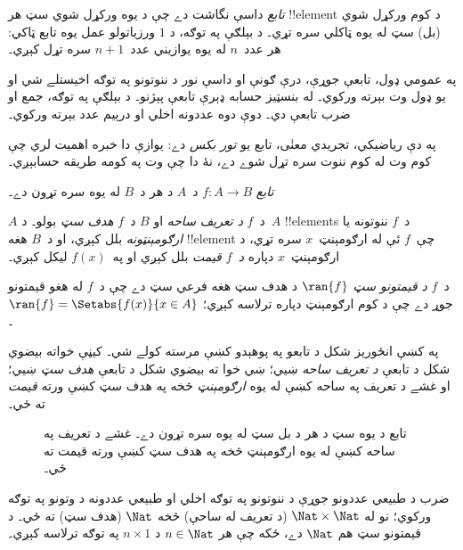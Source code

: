 \documentclass[../../../include/open-logic-section]{subfiles}
\begin{document}

\begin{explain}
\emph{تابع} داسې نگاشت دے چې د يوه ورکړل شوي سټ هر !!{element}
د کوم ورکړل شوي (بل) سټ له يوه ټاکلي  سره تړي۔
د بېلګې په توګه، د $1$ ورزياتولو عمل يوه تابع ټاکي: هر عدد~$n$
له يوه يوازيني عدد~$n+1$ سره تړل کېږي۔
  
په عمومي ډول، تابعې جوړې، درې ګونې او داسې نور د ننوتونو په توګه
اخيستلے شي او يو ډول وت بېرته ورکوي۔ له بنسټيز حسابه ډېرې تابعې
پېژنو۔ د بېلګې په توګه، جمع او ضرب تابعې دي۔ دوې دوه عددونه
اخلي او درېيم عدد بېرته ورکوي۔

په دې رياضيکي، تجريدي معنٰی، تابع يو \emph{تور بکس} دے:
يوازې دا خبره اهميت لري چې کوم وت له کوم ننوت سره تړل شوے دے،
نۀ دا چې وت په کومه طريقه حسابېږي۔
\end{explain}

\begin{defn}[تابع]
\emph{تابع} $f \colon A \to B$ د~$A$ د هر 
د~$B$ له يوه  سره تړون دے۔

$A$ د~$f$ \emph{د تعريف ساحه} او $B$ د~$f$ \emph{هدف سټ} بولو۔
د~$A$ !!{element}s د~$f$ ننوتونه يا \emph{ارګومېنټونه} بلل کېږي،
او د~$B$ هغه !!{element} چې~$f$ ئې له ارګومېنټ~$x$ سره تړي،
د ارګومېنټ~$x$ دپاره \emph{د~$f$ قيمت} بلل کېږي او په~$f(x)$ ليکل کېږي۔

د~$f$ \emph{د قيمتونو سټ} $\ran{f}$ د هدف سټ هغه فرعي سټ دے چې
د~$f$ له هغو قيمتونو جوړ دے چې د کوم ارګومېنټ دپاره ترلاسه کېږي؛
$\ran{f} = \Setabs{f(x)}{x \in A}$۔
\end{defn}

په  کښې انځوريز شکل د تابعو په پوهېدو کښې مرسته
کولے شي۔ کيڼې خواته بيضوي شکل د تابعې \emph{د تعريف ساحه} ښيي؛
ښي خوا ته بيضوي شکل د تابعې \emph{هدف سټ} ښيي؛ او غشے د تعريف
په ساحه کښې له يوه \emph{ارګومېنټ} څخه په هدف سټ کښې ورته
\emph{قيمت} ته ځي۔

\begin{figure}
  \caption{تابع د يوه سټ د هر  د بل سټ له
    يوه  سره تړون دے۔ غشے د تعريف په ساحه کښې
    له يوه ارګومېنټ څخه په هدف سټ کښې ورته قيمت ته ځي۔}
\end{figure}

\begin{ex}
ضرب د طبيعي عددونو جوړې د ننوتونو په توګه اخلي او طبيعي عددونه
د وتونو په توګه ورکوي؛ نو له $\Nat \times \Nat$ (د تعريف له ساحې)
څخه $\Nat$ (هدف سټ) ته ځي۔ د قيمتونو سټ هم $\Nat$ دے، ځکه چې
هر $n \in \Nat$ د $n \times 1$ په توګه ترلاسه کېږي۔
\end{ex}
\end{document}
